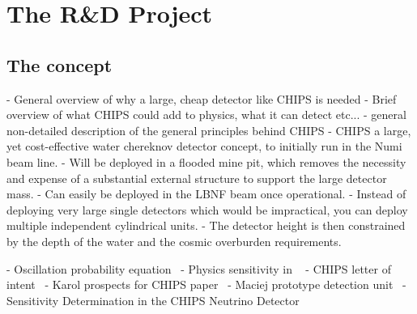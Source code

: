 \chapter{The \chips R\&D Project} %
\label{chap:chips}

\section{The \chips concept} %
\label{sec:chips_concept} %

- General overview of why a large, cheap detector like CHIPS is needed
- Brief overview of what CHIPS could add to physics, what it can detect etc...
- general non-detailed description of the general principles behind CHIPS
- CHIPS a large, yet cost-effective water chereknov detector concept, to initially run in the
Numi beam line.
- Will be deployed in a flooded mine pit, which removes the necessity and expense of a substantial
external structure to support the large detector mass.
- Can easily be deployed in the LBNF beam once operational.
- Instead of deploying very large single detectors which would be impractical, you can deploy
multiple independent cylindrical units.
- The detector height is then constrained by the depth of the water and the cosmic overburden
requirements.

- Oscillation probability equation~\cite{cervera2000}
- Physics sensitivity in ~\cite{pfutzner2017}
- CHIPS letter of intent~\cite{adamson2013}
- Karol prospects for CHIPS paper~\cite{lang2015}
- Maciej prototype detection unit~\cite{pfutznerProto2017}
- Sensitivity Determination in the CHIPS Neutrino Detector~\cite{adde2016}

